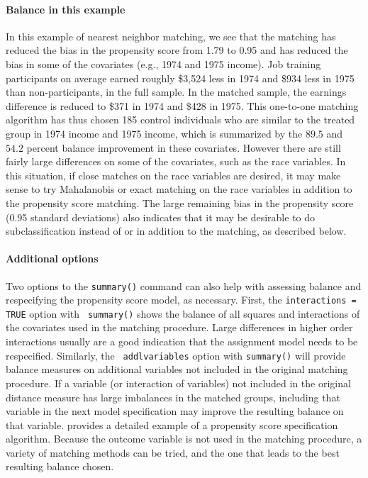 \documentclass[oneside,letterpaper,titlepage]{article}
\begin{document}
\paragraph{Balance in this example}

In this example of nearest neighbor matching, we see that the matching
has reduced the bias in the propensity score from 1.79 to 0.95 and has
reduced the bias in some of the covariates (e.g., 1974 and 1975
income).  Job training participants on average earned roughly \$3,524
less in 1974 and \$934 less in 1975 than non-participants, in the full
sample.  In the matched sample, the earnings difference is reduced to
\$371 in 1974 and \$428 in 1975.  This one-to-one matching algorithm
has thus chosen 185 control individuals who are similar to the treated
group in 1974 income and 1975 income, which is summarized by the
$89.5$ and $54.2$ percent balance improvement in these covariates.
However there are still fairly large differences on some of the
covariates, such as the race variables.  In this situation, if close
matches on the race variables are desired, it may make sense to try
Mahalanobis or exact matching on the race variables in addition to the
propensity score matching.  The large remaining bias in the propensity
score (0.95 standard deviations) also indicates that it may be
desirable to do subclassification instead of or in addition to the
matching, as described below.

\paragraph{Additional options}

Two options to the \texttt{summary()} command can also help with
assessing balance and respecifying the propensity score model, as
necessary.  First, the {\tt interactions = TRUE} option with {\tt
  summary()} shows the balance of all squares and interactions of the
covariates used in the matching procedure.  Large differences in
higher order interactions usually are a good indication that the
assignment model needs to be respecified.  Similarly, the {\tt
  addlvariables} option with {\tt summary()} will provide balance
measures on additional variables not included in the original matching
procedure.  If a variable (or interaction of variables) not included
in the original distance measure has large imbalances in the matched
groups, including that variable in the next model specification may
improve the resulting balance on that variable.  \cite{DehWah99}
provides a detailed example of a propensity score specification
algorithm.  Because the outcome variable is not used in the matching
procedure, a variety of matching methods can be tried, and the one
that leads to the best resulting balance chosen.
\end{document}
